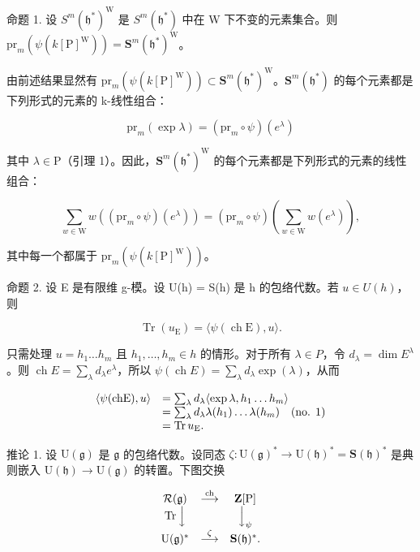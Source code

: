 命题 1. 设 \(S^m(\mathfrak{h}^*)^{\mathrm{W}}\) 是 \(S^m(\mathfrak{h}^*)\) 中在 W 下不变的元素集合。则 \(\mathrm{pr}_m(\psi(k[\mathrm{P}]^{\mathrm{W}})) = \mathbf{S}^m(\mathfrak{h}^*)^{\mathrm{W}}\)。

由前述结果显然有 \(\mathrm{pr}_{m}(\psi(k[\mathrm{P}]^{\mathrm{W}})) \subset \mathbf{S}^{m}(\mathfrak{h}^{*})^{\mathrm{W}}\)。\(\mathbf{S}^{m}(\mathfrak{h}^{*})\) 的每个元素都是下列形式的元素的 k-线性组合：

\[
\mathrm{pr} _ {m} (\exp \lambda) = (\mathrm{pr} _ {m} \circ \psi) (e ^ {\lambda})
\]

其中 \(\lambda \in \mathrm{P}\)（引理 1）。因此，\(\mathbf{S}^m (\mathfrak{h}^*)^{\mathrm{W}}\) 的每个元素都是下列形式的元素的线性组合：

\[
\sum_ {w \in \mathrm{W}} w ((\mathrm{pr} _ {m} \circ \psi) (e ^ {\lambda})) = (\mathrm{pr} _ {m} \circ \psi) \left(\sum_ {w \in \mathrm{W}} w (e ^ {\lambda})\right),
\]

其中每一个都属于 \(\mathrm{pr}_m(\psi (k[\mathrm{P}]^{\mathrm{W}}))\)。

命题 2. 设 E 是有限维 g-模。设 U(h) = S(h) 是 h 的包络代数。若 \(u \in U(h)\)，则

\[
\operatorname{Tr} (u _ {\mathrm{E}}) = \langle \psi (\operatorname{ch} \mathrm{E}), u \rangle .
\]

只需处理 \(u = h_{1} \ldots h_{m}\) 且 \(h_{1}, \ldots, h_{m} \in h\) 的情形。对于所有 \(\lambda \in P\)，令 \(d_{\lambda} = \dim E^{\lambda}\)。则 \(\operatorname{ch} E = \sum_{\lambda} d_{\lambda} e^{\lambda}\)，所以 \(\psi(\operatorname{ch} E) = \sum_{\lambda} d_{\lambda} \exp(\lambda)\)，从而

\[
\begin{array}{r l} \langle \psi (\mathrm{chE}), u \rangle & = \sum_ {\lambda} d _ {\lambda} \langle \exp \lambda , h _ {1} \dots h _ {m} \rangle \\ & = \sum_ {\lambda} d _ {\lambda} \lambda (h _ {1}) \dots \lambda (h _ {m}) \quad (\text {no. 1}) \\ & = \operatorname{Tr} u _ {\mathrm{E}}. \end{array}
\]

推论 1. 设 \(\mathrm{U}(\mathfrak{g})\) 是 \(\mathfrak{g}\) 的包络代数。设同态 \(\zeta : \mathrm{U}(\mathfrak{g})^* \to \mathrm{U}(\mathfrak{h})^* = \mathbf{S}(\mathfrak{h})^*\) 是典则嵌入 \(\mathrm{U}(\mathfrak{h}) \to \mathrm{U}(\mathfrak{g})\) 的转置。下图交换

\[
\begin{array}{c c c} \mathcal {R} (\mathfrak {g}) & \stackrel {{\text {ch}}} {{\longrightarrow}} & \mathbf {Z} [ \mathrm{P} ] \\ \operatorname{Tr} \Big \downarrow & & \Big \downarrow_ {\psi} \\ \mathrm{U} (\mathfrak {g}) ^ {*} & \stackrel {{\zeta}} {{\longrightarrow}} & \mathbf {S} (\mathfrak {h}) ^ {*}. \end{array}
\]


